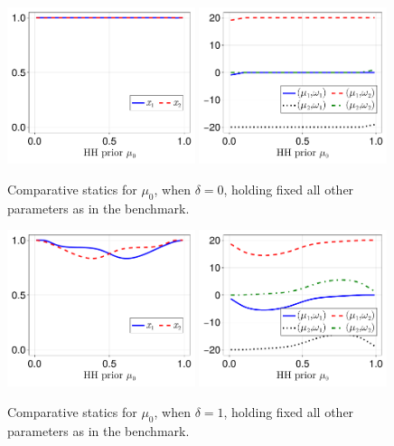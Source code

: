 \documentclass[12pt,a4paper]{article}
\begin{document}
\begin{figure}[H]
\centering
\includegraphics[width=0.49\textwidth]{figures/V8/γ_10/fig_optimal_π_across_μ_0_ω_1_1_ω_2_-1_δ_0.0_.pdf}
\includegraphics[width=0.49\textwidth]{figures/V8/γ_10/fig_posterior_across_μ_0_ω_1_1_ω_2_-1_δ_0.0_.pdf}
\caption{Comparative statics for $\mu_0$, when $\delta=0$, holding fixed all other parameters as in the benchmark.}
\label{FigureA1}
\end{figure}

\begin{figure}[H]
\centering
\includegraphics[width=0.49\textwidth]{figures/V8/γ_10/fig_optimal_π_across_μ_0_ω_1_1_ω_2_-1_δ_1.0_.pdf}
\includegraphics[width=0.49\textwidth]{figures/V8/γ_10/fig_posterior_across_μ_0_ω_1_1_ω_2_-1_δ_1.0_.pdf}
\caption{Comparative statics for $\mu_0$, when $\delta=1$, holding fixed all other parameters as in the benchmark.}
\label{FigureA2}
\end{figure}
\end{document}
